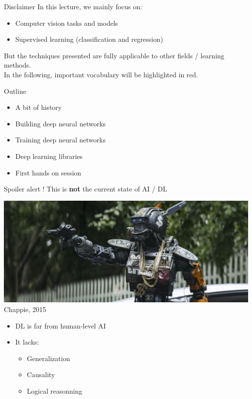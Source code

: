 \documentclass[usenames,dvipsnames]{beamer}
\begin{document}
    \begin{frame}{\secname}
        \begin{block}{Disclaimer}
            In this lecture, we mainly focus on:
            \begin{itemize}
                \item Computer vision tasks and models
                \item Supervised learning (classification and regression)
            \end{itemize}
            But the techniques presented are fully applicable to other fields / learning methods.\\
            In the following, important \alert{vocabulary} will be highlighted in red.
        \end{block}
    \end{frame}
    \begin{frame}{\secname}
        Outline
        \begin{itemize}
            \item A bit of history
            \item Building deep neural networks
            \item Training deep neural networks
            \item Deep learning libraries
            \item First hands on session
        \end{itemize}
    \end{frame}
    \begin{frame}{\secname}
        Spoiler alert ! This is \textbf{not} the current state of AI / DL
        \begin{center}
            \includegraphics[width=0.8\linewidth]{figures/DL_fundamentals/Chappie_2015_1.jpg}
            {\tiny Chappie, 2015}
        \end{center}
        \begin{itemize}
            \item DL is far from human-level AI
            \item It lacks:
            \begin{itemize}
                \item Generalization
                \item Causality
                \item Logical reasonning
            \end{itemize}
        \end{itemize}
    \end{frame}
\end{document}
